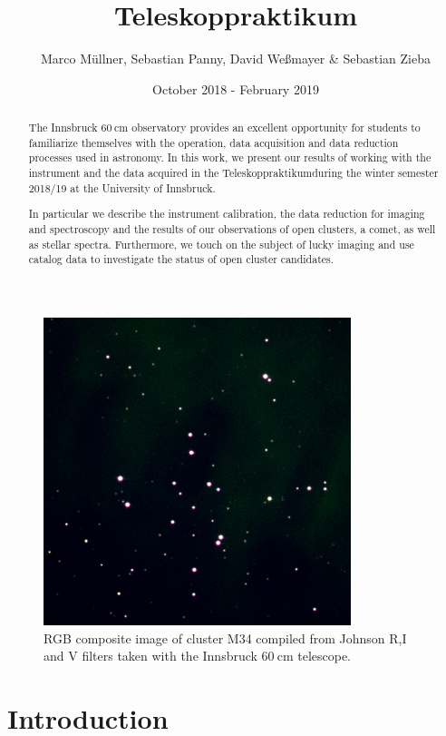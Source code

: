 \documentclass{article}
\title{Teleskoppraktikum}
\author{Marco Müllner, Sebastian Panny, David Weßmayer \& Sebastian Zieba}
\date{October 2018 - February 2019}
\begin{document}
\maketitle

\begin{figure}[H]
    \centering
    \includegraphics[width=0.8\textwidth,angle=-90]{Cluster/RGB_M34.png}
    \caption{RGB composite image of cluster M34 compiled from Johnson R,I and V filters taken with the Innsbruck $\SI{60}{\cm}$ telescope.}
    \label{fig:title} 
\end{figure}

\begin{abstract}
The Innsbruck $\SI{60}{\cm}$ observatory provides an excellent opportunity for students to familiarize themselves with the operation, data acquisition and data reduction processes used in astronomy. In this work, we present our results of working with the instrument and the data acquired in the \ldq Teleskoppraktikum\rdq during the winter semester 2018/19 at the University of Innsbruck.

In particular we describe the instrument calibration, the data reduction for imaging and spectroscopy and the results of our observations of open clusters, a comet, as well as stellar spectra. Furthermore, we touch on the subject of lucky imaging and use catalog data to investigate the status of open cluster candidates. 
\end{abstract}

\pagebreak
\tableofcontents

\pagebreak
\section{Introduction}
\end{document}
